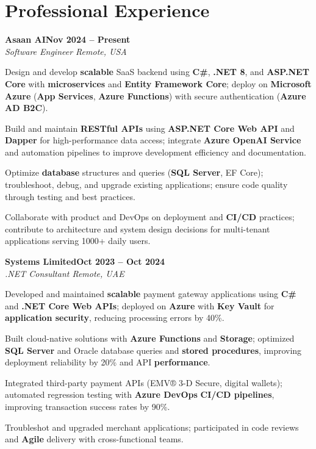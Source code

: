 \documentclass[letterpaper,10pt]{article}
\newcommand{\headingBf}[2]{
  \hspace{10pt}\textbf{#1}\hfill\textbf{#2}\\
}
\newcommand{\headingIt}[2]{
  \hspace{10pt}\textit{#1}\hfill\textit{#2}\\
}
\newenvironment{resume_list}{
  \vspace{-7pt}
  \begin{itemize}[itemsep=-2px, parsep=1pt, leftmargin=30pt]
}{
  \end{itemize}
}
\begin{document}
\section{Professional Experience}

\headingBf{Asaan AI}{Nov 2024 -- Present}
\headingIt{Software Engineer \hfill Remote, USA}{}
\begin{resume_list}
    \item Design and develop \textbf{scalable} SaaS backend using \textbf{C\#}, \textbf{.NET 8}, and \textbf{ASP.NET Core} with \textbf{microservices} and \textbf{Entity Framework Core}; deploy on \textbf{Microsoft Azure} (\textbf{App Services}, \textbf{Azure Functions}) with secure authentication (\textbf{Azure AD B2C}).
    \item Build and maintain \textbf{RESTful APIs} using \textbf{ASP.NET Core Web API} and \textbf{Dapper} for high-performance data access; integrate \textbf{Azure OpenAI Service} and automation pipelines to improve development efficiency and documentation.
    \item Optimize \textbf{database} structures and queries (\textbf{SQL Server}, EF Core); troubleshoot, debug, and upgrade existing applications; ensure code quality through testing and best practices.
    \item Collaborate with product and DevOps on deployment and \textbf{CI/CD} practices; contribute to architecture and system design decisions for multi-tenant applications serving 1000+ daily users.
\end{resume_list}

\headingBf{Systems Limited}{Oct 2023 -- Oct 2024}
\headingIt{.NET Consultant \hfill Remote, UAE}{}
\begin{resume_list}
    \item Developed and maintained \textbf{scalable} payment gateway applications using \textbf{C\#} and \textbf{.NET Core Web APIs}; deployed on \textbf{Azure} with \textbf{Key Vault} for \textbf{application security}, reducing processing errors by 40\%.
    \item Built cloud-native solutions with \textbf{Azure Functions} and \textbf{Storage}; optimized \textbf{SQL Server} and Oracle database queries and \textbf{stored procedures}, improving deployment reliability by 20\% and API \textbf{performance}.
    \item Integrated third-party payment APIs (EMV® 3-D Secure, digital wallets); automated regression testing with \textbf{Azure DevOps} \textbf{CI/CD pipelines}, improving transaction success rates by 90\%.
    \item Troubleshot and upgraded merchant applications; participated in code reviews and \textbf{Agile} delivery with cross-functional teams.
\end{resume_list}
\end{document}
